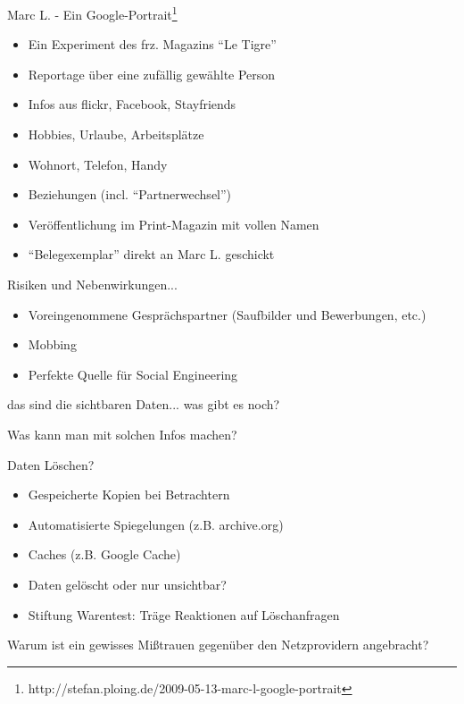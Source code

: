 \begin{frame}{Marc L. - Ein Google-Portrait\footnote{http://stefan.ploing.de/2009-05-13-marc-l-google-portrait}}
	\begin{itemize}
		\item Ein Experiment des frz. Magazins "`Le Tigre"'
		\item<2-> Reportage über eine zufällig gewählte Person
		\item<2-> Infos aus flickr, Facebook, Stayfriends
		\item<3-> Hobbies, Urlaube, Arbeitsplätze
		\item<3-> Wohnort, Telefon, Handy
		\item<3-> Beziehungen (incl. "`Partnerwechsel"')
		\item<4-> Veröffentlichung im Print-Magazin mit vollen Namen
		\item<4-> "`Belegexemplar"' direkt an Marc L. geschickt
	\end{itemize}
\end{frame}

\begin{frame}{Risiken und Nebenwirkungen...}
	\begin{itemize}
		\item Voreingenommene Gesprächspartner (Saufbilder und Bewerbungen, etc.)
		\item Mobbing
		\item Perfekte Quelle für Social Engineering
	\end{itemize}
\end{frame}

\begin{frame}{das sind die sichtbaren Daten... was gibt es noch?}
\end{frame}

\begin{frame}{Was kann man mit solchen Infos machen?}
\end{frame}

\begin{frame}{Daten Löschen?}
	\begin{itemize}
		\item Gespeicherte Kopien bei Betrachtern
		\item Automatisierte Spiegelungen (z.B. archive.org)
		\item Caches (z.B. Google Cache)
		\item Daten gelöscht oder nur unsichtbar?
		\item Stiftung Warentest: Träge Reaktionen auf Löschanfragen
	\end{itemize}
\end{frame}

\begin{frame}{Warum ist ein gewisses Mißtrauen gegenüber den Netzprovidern angebracht?}
\end{frame}

